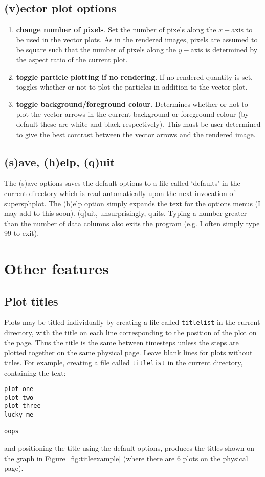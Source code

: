 \documentclass[a4paper,12pt]{article}
\begin{document}
\subsection{(v)ector plot options}
\begin{enumerate}
\item \textbf{change number of pixels}. Set the number of pixels along the
$x-$axis to be used in the vector plots. As in the rendered images, pixels are assumed to be square such that the number of pixels along
the $y-$axis is determined by the aspect ratio of the current plot.
\item \textbf{toggle particle plotting if no rendering}. If no rendered quantity
is set, toggles whether or not to plot the particles in addition to the vector
plot.
\item \textbf{toggle background/foreground colour}. Determines whether or not to
plot the vector arrows in the current background or foreground colour (by
default these are white and black respectively). This must
be user determined to give the best contrast between the vector arrows and the
rendered image.
\end{enumerate}

\subsection{(s)ave, (h)elp, (q)uit}
 The (s)ave options saves the default options to a file called `defaults' in the
current directory which is read automatically upon the next invocation of
supersphplot. The (h)elp option simply expands the text for the options menus (I
may add to this soon). (q)uit, unsurprisingly, quits. Typing a number greater than the number of
data columns also exits the program (e.g. I often simply type 99 to exit).

\section{Other features}

\subsection{Plot titles}
\label{sec:title}
 Plots may be titled individually by creating a file called \verb+titlelist+ in
the current directory, with the title on each line corresponding to the position
of the plot on the page. Thus the title is the same between timesteps unless the
steps are plotted together on the same physical page. Leave blank lines for
plots without titles. For example, creating a file called \verb+titlelist+ in
the current directory, containing the text:
\begin{verbatim}
plot one
plot two
plot three
lucky me

oops
\end{verbatim}
and positioning the title using the default options, produces the titles shown
on the graph in Figure~\ref{fig:titleexample} (where there are 6 plots on the physical page).
\end{document}
